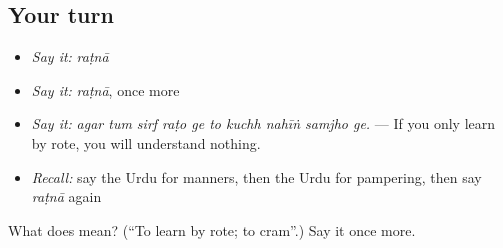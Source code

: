 \subsection*{Your turn}
\begin{itemize}
\raggedright
  \item \emph{Say it:} \emph{raṭnā}
  \item \emph{Say it:} \emph{raṭnā}, once more
  \item \emph{Say it:} \emph{agar tum sirf raṭo ge to kuchh nahīṅ samjho ge.} — If you only learn by rote, you will understand nothing.
  \item \emph{Recall:} say the Urdu for manners, then the Urdu for pampering, then say \emph{raṭnā} again
\end{itemize}

\begin{tcolorbox}[breakable,colback=teal!4,colframe=teal!35!black,title={Before you move on}]
What does  mean? (\textquotedblleft{}To learn by rote; to cram\textquotedblright{}.) Say it once more.
\end{tcolorbox}
